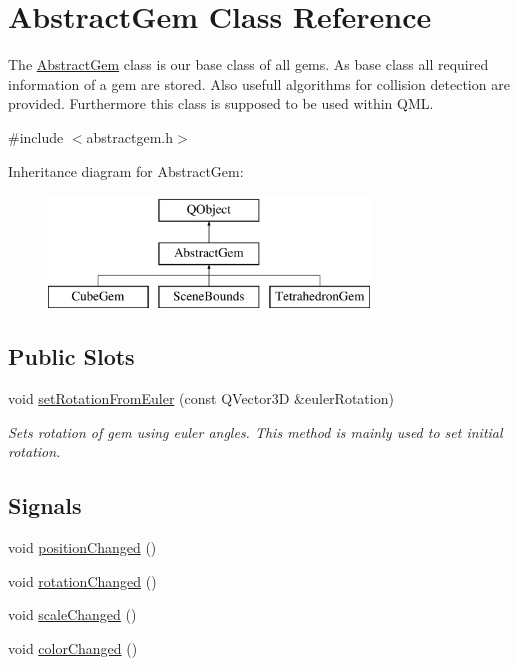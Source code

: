 \hypertarget{class_abstract_gem}{}\section{Abstract\+Gem Class Reference}
\label{class_abstract_gem}


The \hyperlink{class_abstract_gem}{Abstract\+Gem} class is our base class of all gems.  As base class all required information of a gem are stored. Also usefull algorithms for collision detection are provided. Furthermore this class is supposed to be used within Q\+M\+L.  




{\ttfamily \#include $<$abstractgem.\+h$>$}

Inheritance diagram for Abstract\+Gem\+:\begin{figure}[H]
\begin{center}
\leavevmode
\includegraphics[height=3.000000cm]{class_abstract_gem}
\end{center}
\end{figure}
\subsection*{Public Slots}
\begin{DoxyCompactItemize}
\item 
void \hyperlink{class_abstract_gem_a6198aae1f2f54d73a7a5e66ca60f5f67}{set\+Rotation\+From\+Euler} (const Q\+Vector3\+D \&euler\+Rotation)
\begin{DoxyCompactList}\small\item\em Sets rotation of gem using euler angles. This method is mainly used to set initial rotation. \end{DoxyCompactList}\end{DoxyCompactItemize}
\subsection*{Signals}
\begin{DoxyCompactItemize}
\item 
void \hyperlink{class_abstract_gem_ac84dd4c9b3ea3adf02c1bfa74a29b649}{position\+Changed} ()
\item 
void \hyperlink{class_abstract_gem_a2702e870321deb40a8f056c1fce01094}{rotation\+Changed} ()
\item 
void \hyperlink{class_abstract_gem_a7e6bfe659f09bc68222211a58c365177}{scale\+Changed} ()
\item 
void \hyperlink{class_abstract_gem_ae20ad53d4ddeff9fc13878e7db5a3253}{color\+Changed} ()
\end{DoxyCompactItemize}
